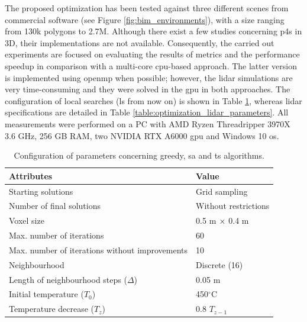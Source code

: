 The proposed optimization has been tested against three different scenes from commercial software (see Figure \ref{fig:bim_environments}), with a size ranging from 130k polygons to 2.7M. Although there exist a few studies concerning \acrshort{p4s} in 3D, their implementations are not available. Consequently, the carried out experiments are focused on evaluating the results of metrics and the performance speedup in comparison with a multi-core \acrshort{cpu}-based approach. The latter version is implemented using \acrshort{openmp} when possible; however, the \acrshort{lidar} simulations are very time-consuming and they were solved in the \acrshort{gpu} in both approaches. The configuration of local searches (\acrshort{ls} from now on) is shown in Table \ref{table:local_search_settings}, whereas \acrshort{lidar} specifications are detailed in Table \ref{table:optimization_lidar_parameters}. All measurements were performed on a PC with AMD Ryzen Threadripper 3970X 3.6 GHz, 256 GB RAM, two NVIDIA RTX A6000 \acrshort{gpu} and Windows 10 \acrshort{os}. 

\renewcommand{\arraystretch}{1.15}
\begin{table}[hb]
\caption{Configuration of parameters concerning greedy, \acrshort{sa} and \acrshort{ts} algorithms.}
\label{table:local_search_settings}
\begin{tabular}{@{}ll@{}}
\toprule
\textbf{Attributes} & \textbf{Value}\\
\midrule
Starting solutions & Grid sampling\\
Number of final solutions & Without restrictions\\
Voxel size & 0.5 \si{\meter} $\times\hspace{1mm}$0.4 \si{\meter}\\
\midrule
Max. number of iterations & 60\\
Max. number of iterations without improvements & 10\\
\midrule
Neighbourhood & Discrete (16)\\
Length of neighbourhood steps ($\Delta$) & 0.05 $\si{\meter}$\\
\midrule
Initial temperature ($T_0$) & 450$^{\circ}$C\\
Temperature decrease ($T_z$) & 0.8 $T_{z-1}$\\
\bottomrule
\end{tabular}
\end{table}
\renewcommand{\arraystretch}{1}

